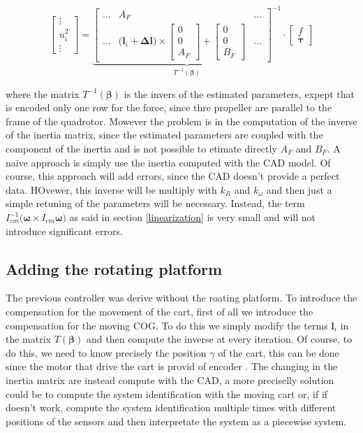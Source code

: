 \begin{equation}
	\begin{bmatrix}
		\vdots \\
		u_i^2 \\
		\vdots
	\end{bmatrix}
	=
	\underbrace{
	\begin{bmatrix}
		\dots   & A_F   & \dots  \\
		\dots & \Big(\mathbf{l}_i + \boldsymbol{\Delta l}\Big)\times\begin{bmatrix}0 \\ 0 \\ A_F \end{bmatrix}+\begin{bmatrix}0 \\ 0 \\ B_F\end{bmatrix} & \dots
	\end{bmatrix}^{-1}
	}_{T^{-1}(\boldsymbol{\beta})}	
	\cdot
	\begin{bmatrix}
		f \\
		\boldsymbol{\tau}
	\end{bmatrix}
	\label{eq:mixingMatrix}
\end{equation}

\noindent where the matrix $T^{-1}(\boldsymbol{\beta})$ is the invers of the estimated parameters, expept that is encoded only one row for the force, since thre propeller are parallel to the frame of the quadrotor. Mowever the problem is in the computation of the inverse of the inertia matrix, since the estimated parameters are coupled with the component of the inertia and is not possible to etimate directly $A_F$ and $B_F$. A naive approach is simply use the inertia computed with the CAD model. Of course, this approach will add errors, since the CAD doesn't provide a perfect data. HOvewer, this inverse will be multiply with $k_R$ and $k_{\omega}$ and then just a simple retuning of the parameters will be necessary. Instead, the term $I_{cm}^{-1}\bigl(\boldsymbol{\omega}\times I_{cm}\boldsymbol{\omega}\bigl)$ as said in section \ref{linearization} is very small and will not introduce significant errors.


\subsection{Adding the rotating platform}

The previous controller was derive without the roating platform. To introduce the compensation for the movement of the cart, first of all we introduce the compensation for the moving COG. To do this we simply modify the terms $\mathbf{l}_i$ in the matrix $T(\boldsymbol{\beta})$ and then compute the inverse at every iteration. Of course, to do this, we need to know precisely the position $\gamma$ of the cart, this can be done since the motor that drive the cart is provid of encoder \cite{Carlos}. The changing in the inertia matrix are instead compute with the CAD, a more preciselly solution could be to compute the system identification with the moving cart or, if if doesn't work, compute the system identification multiple times with different positions of the sensors and then interpretate the system as a piecewise system.

